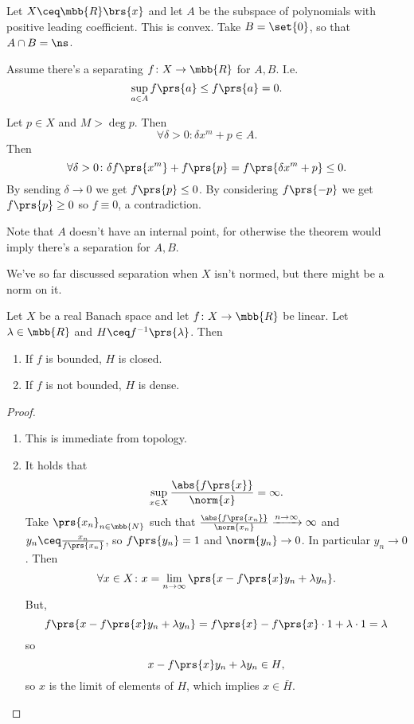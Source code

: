 \documentclass[10pt, twoside]{book}
\begin{document}
\begin{example}
Let $X \ceq \mbb{R}\brs{x}$ and let $A$ be the subspace of polynomials with positive leading coefficient. This is convex. Take $B = \set{0}$, so that $A \cap B = \ns$.

Assume there's a separating $f \colon X \to \mbb{R}$ for $A,B$. I.e.
\[\sup_{a \in A} f\prs{a} \leq f\prs{a} = 0 \text{.}\]

Let $p \in X$ and $M > \deg p$. Then
\[\forall \delta >0 \colon \delta x^m + p \in A \text{.}\]
Then
\[\forall \delta > 0 \colon \delta f\prs{x^m} + f\prs{p} = f\prs{\delta x^m + p} \leq 0 \text{.}\]
By sending $\delta \to 0$ we get $f\prs{p} \leq 0$. By considering $f\prs{-p}$ we get $f\prs{p} \geq 0$ so $f \equiv 0$, a contradiction.

Note that $A$ doesn't have an internal point, for otherwise the theorem would imply there's a separation for $A,B$.
\end{example}

We've so far discussed separation when $X$ isn't normed, but there might be a norm on it.

\begin{proposition}
Let $X$ be a real Banach space and let $f \colon X \to \mbb{R}$ be linear. Let $\lambda \in \mbb{R}$ and $H \ceq f^{-1}\prs{\lambda}$. Then
\begin{enumerate}
\item If $f$ is bounded, $H$ is closed.
\item If $f$ is not bounded, $H$ is dense.
\end{enumerate}
\end{proposition}

\begin{proof}
\begin{enumerate}
\item This is immediate from topology.
\item It holds that
\begin{align*}
\sup_{x \in X} \frac{\abs{f\prs{x}}}{\norm{x}} = \infty \text{.}
\end{align*}
Take $\prs{x_n}_{n \in \mbb{N}}$ such that $\frac{\abs{f\prs{x_n}}}{\norm{x_n}} \xrightarrow{n\to\infty} \infty$ and $y_n \ceq \frac{x_n}{f\prs{x_n}}$, so $f\prs{y_n} = 1$ and $\norm{y_n} \to 0$. In particular $y_n \to 0$.
Then
\begin{align*}
\forall x\in X \colon x = \lim_{n \to \infty} \prs{x - f\prs{x} y_n + \lambda y_n} \text{.}
\end{align*}
But,
\[f\prs{x - f\prs{x} y_n + \lambda y_n} = f\prs{x} - f\prs{x} \cdot 1 + \lambda \cdot 1 = \lambda\]
so
\[x - f\prs{x} y_n + \lambda y_n \in H \text{,}\]
so $x$ is the limit of elements of $H$, which implies $x \in \bar{H}$.
\end{enumerate}
\end{proof}
\end{document}
